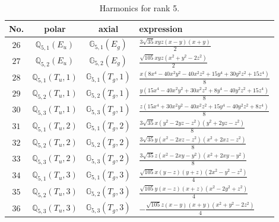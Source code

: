 \documentclass[fleqn,8pt,landscape]{jsarticle}
\begin{document}
\begin{table}[ht!]
\begin{center}
\caption{Harmonics for rank 5.}
\renewcommand{\arraystretch}{1.3}
\begin{tabular}{cccl} \hline \hline
No. & polar & axial & expression \\ \hline
$ 26 $ & $ \mathbb{Q}_{5,1}(E_{u}) $ & $ \mathbb{G}_{5,1}(E_{g}) $ & $ \frac{3 \sqrt{35} x y z \left(x - y\right) \left(x + y\right)}{2} $ \\
$ 27 $ & $ \mathbb{Q}_{5,2}(E_{u}) $ & $ \mathbb{G}_{5,2}(E_{g}) $ & $ \frac{\sqrt{105} x y z \left(x^{2} + y^{2} - 2 z^{2}\right)}{2} $ \\
$ 28 $ & $ \mathbb{Q}_{5,1}(T_{u},1) $ & $ \mathbb{G}_{5,1}(T_{g},1) $ & $ \frac{x \left(8 x^{4} - 40 x^{2} y^{2} - 40 x^{2} z^{2} + 15 y^{4} + 30 y^{2} z^{2} + 15 z^{4}\right)}{8} $ \\
$ 29 $ & $ \mathbb{Q}_{5,2}(T_{u},1) $ & $ \mathbb{G}_{5,2}(T_{g},1) $ & $ \frac{y \left(15 x^{4} - 40 x^{2} y^{2} + 30 x^{2} z^{2} + 8 y^{4} - 40 y^{2} z^{2} + 15 z^{4}\right)}{8} $ \\
$ 30 $ & $ \mathbb{Q}_{5,3}(T_{u},1) $ & $ \mathbb{G}_{5,3}(T_{g},1) $ & $ \frac{z \left(15 x^{4} + 30 x^{2} y^{2} - 40 x^{2} z^{2} + 15 y^{4} - 40 y^{2} z^{2} + 8 z^{4}\right)}{8} $ \\
$ 31 $ & $ \mathbb{Q}_{5,1}(T_{u},2) $ & $ \mathbb{G}_{5,1}(T_{g},2) $ & $ \frac{3 \sqrt{35} x \left(y^{2} - 2 y z - z^{2}\right) \left(y^{2} + 2 y z - z^{2}\right)}{8} $ \\
$ 32 $ & $ \mathbb{Q}_{5,2}(T_{u},2) $ & $ \mathbb{G}_{5,2}(T_{g},2) $ & $ \frac{3 \sqrt{35} y \left(x^{2} - 2 x z - z^{2}\right) \left(x^{2} + 2 x z - z^{2}\right)}{8} $ \\
$ 33 $ & $ \mathbb{Q}_{5,3}(T_{u},2) $ & $ \mathbb{G}_{5,3}(T_{g},2) $ & $ \frac{3 \sqrt{35} z \left(x^{2} - 2 x y - y^{2}\right) \left(x^{2} + 2 x y - y^{2}\right)}{8} $ \\
$ 34 $ & $ \mathbb{Q}_{5,1}(T_{u},3) $ & $ \mathbb{G}_{5,1}(T_{g},3) $ & $ \frac{\sqrt{105} x \left(y - z\right) \left(y + z\right) \left(2 x^{2} - y^{2} - z^{2}\right)}{4} $ \\
$ 35 $ & $ \mathbb{Q}_{5,2}(T_{u},3) $ & $ \mathbb{G}_{5,2}(T_{g},3) $ & $ \frac{\sqrt{105} y \left(x - z\right) \left(x + z\right) \left(x^{2} - 2 y^{2} + z^{2}\right)}{4} $ \\
$ 36 $ & $ \mathbb{Q}_{5,3}(T_{u},3) $ & $ \mathbb{G}_{5,3}(T_{g},3) $ & $ - \frac{\sqrt{105} z \left(x - y\right) \left(x + y\right) \left(x^{2} + y^{2} - 2 z^{2}\right)}{4} $ \\
 \hline \hline
\end{tabular}
\end{center}
\end{table}
\end{document}
